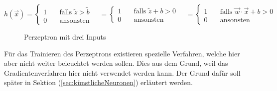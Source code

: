 \begin{equation}\label{eq:perzeptron_1}
  h(\vec{x}) =
  \begin{cases}
    1 & \quad \text{falls } \tilde{z} > \tilde{b}\\
    0 & \quad \text{ansonsten}
  \end{cases}
  \quad =
  \begin{cases}
    1 & \quad \text{falls } \tilde{z} + b > 0\\
    0 & \quad \text{ansonsten}
  \end{cases}
  \quad =
  \begin{cases}
    1 & \quad\text{falls } \vec{w} \cdot \vec{x} + b > 0\\
    0 & \quad\text{ansonsten}
  \end{cases}
\end{equation}
\para{}
\begin{figure}[h!]
  \centering
  \caption{Perzeptron mit drei Inputs}
  \label{fi:perzeptron}
\end{figure}
\para{}
Für das Trainieren des Perzeptrons existieren spezielle Verfahren, welche hier
aber nicht weiter beleuchtet werden sollen. Dies aus dem Grund, weil das
Gradientenverfahren hier nicht verwendet werden kann.
Der Grund dafür soll später in Sektion (\ref{sec:künstlicheNeuronen}) erläutert werden.
\para{}
\cite{wiki:perzeptron}
\cite{Nielsen}

